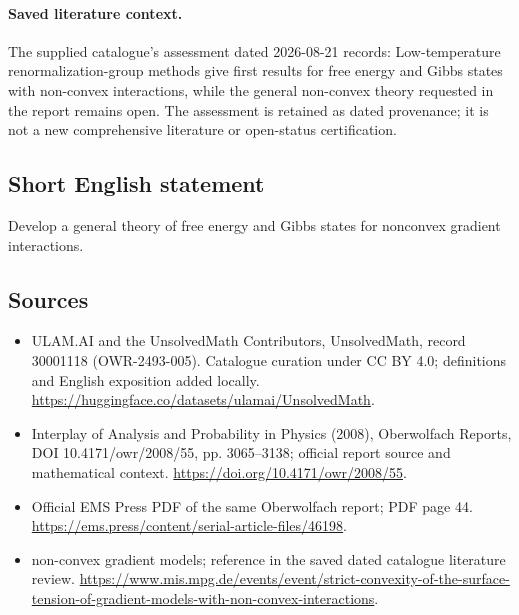 \documentclass[11pt]{article}
\begin{document}
\paragraph{Saved literature context.} The supplied catalogue's assessment dated 2026-08-21 records: Low-temperature renormalization-group methods give first results for free energy and Gibbs states with non-convex interactions, while the general non-convex theory requested in the report remains open. The assessment is retained as dated provenance; it is not a new comprehensive literature or open-status certification.
\subsection{Short English statement}
Develop a general theory of free energy and Gibbs states for nonconvex gradient interactions.
\subsection{Sources}
\begin{itemize}
\item[\hypertarget{source:30001118:1}{S1}] ULAM.AI and the UnsolvedMath Contributors, UnsolvedMath, record 30001118 (OWR-2493-005). Catalogue curation under CC BY 4.0; definitions and English exposition added locally.
\url{https://huggingface.co/datasets/ulamai/UnsolvedMath}.
\item[\hypertarget{source:30001118:2}{S2}] Interplay of Analysis and Probability in Physics (2008), Oberwolfach Reports, DOI 10.4171/owr/2008/55, pp. 3065--3138; official report source and mathematical context.
\url{https://doi.org/10.4171/owr/2008/55}.
\item[\hypertarget{source:30001118:3}{S3}] Official EMS Press PDF of the same Oberwolfach report; PDF page 44.
\url{https://ems.press/content/serial-article-files/46198}.
\item[\hypertarget{source:30001118:4}{S4}] non-convex gradient models; reference in the saved dated catalogue literature review.
\url{https://www.mis.mpg.de/events/event/strict-convexity-of-the-surface-tension-of-gradient-models-with-non-convex-interactions}.
\end{itemize}
\label{end:30001118}
\end{document}
